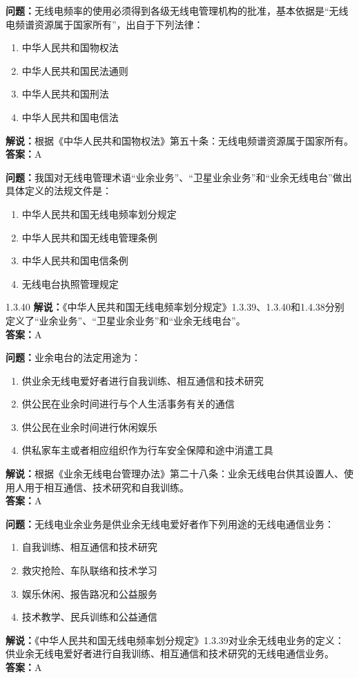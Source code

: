 \documentclass[UTF8]{ctexbook}
\begin{document}
\textbf{问题：}无线电频率的使用必须得到各级无线电管理机构的批准，基本依据是“无线电频谱资源属于国家所有”，出自于下列法律：
\begin{enumerate}[label=\Alph*), leftmargin=3em]
  \item 中华人民共和国物权法
  \item 中华人民共和国民法通则
  \item 中华人民共和国刑法
  \item 中华人民共和国电信法
\end{enumerate}
\textbf{解说：}根据《中华人民共和国物权法》第五十条：无线电频谱资源属于国家所有。\\
\textbf{答案：}A

\textbf{问题：}我国对无线电管理术语“业余业务”、“卫星业余业务”和“业余无线电台”做出具体定义的法规文件是：
\begin{enumerate}[label=\Alph*), leftmargin=3em]
  \item 中华人民共和国无线电频率划分规定
  \item 中华人民共和国无线电管理条例
  \item 中华人民共和国电信条例
  \item 无线电台执照管理规定
\end{enumerate}1.3.40
\textbf{解说：}《中华人民共和国无线电频率划分规定》1.3.39、1.3.40和1.4.38分别定义了“业余业务”、“卫星业余业务”和“业余无线电台”。\\
\textbf{答案：}A

\textbf{问题：}业余电台的法定用途为：
\begin{enumerate}[label=\Alph*), leftmargin=3em]
  \item 供业余无线电爱好者进行自我训练、相互通信和技术研究
  \item 供公民在业余时间进行与个人生活事务有关的通信
  \item 供公民在业余时间进行休闲娱乐
  \item 供私家车主或者相应组织作为行车安全保障和途中消遣工具
\end{enumerate}
\textbf{解说：}根据《业余无线电台管理办法》第二十八条：业余无线电台供其设置人、使用人用于相互通信、技术研究和自我训练。\\
\textbf{答案：}A

\textbf{问题：}无线电业余业务是供业余无线电爱好者作下列用途的无线电通信业务：
\begin{enumerate}[label=\Alph*), leftmargin=3em]
  \item 自我训练、相互通信和技术研究
  \item 救灾抢险、车队联络和技术学习
  \item 娱乐休闲、报告路况和公益服务
  \item 技术教学、民兵训练和公益通信
\end{enumerate}
\textbf{解说：}《中华人民共和国无线电频率划分规定》1.3.39对业余无线电业务的定义：供业余无线电爱好者进行自我训练、相互通信和技术研究的无线电通信业务。\\
\textbf{答案：}A
\end{document}
